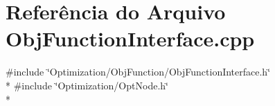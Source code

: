 \section{Referência do Arquivo Obj\+Function\+Interface.\+cpp}
\label{_obj_function_interface_8cpp}
{\ttfamily \#include \char`\"{}Optimization/\+Obj\+Function/\+Obj\+Function\+Interface.\+h\char`\"{}}\\*
{\ttfamily \#include \char`\"{}Optimization/\+Opt\+Node.\+h\char`\"{}}\\*

